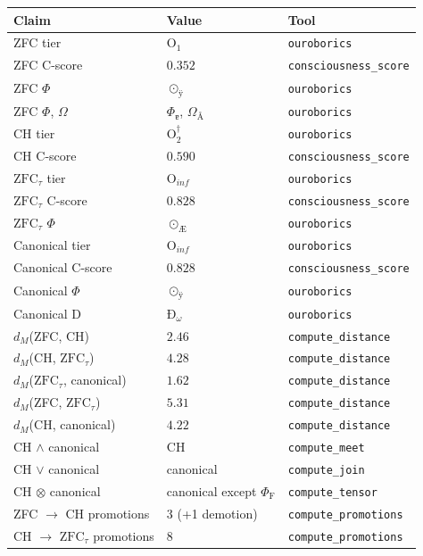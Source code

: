 \documentclass[12pt,twoside]{book}
\theoremstyle{definition}
\newcommand{\ZFCt}{\text{ZFC}_{\tau}}
\newcommand{\prim}[1]{\text{#1}}
\newcommand{\tier}[1]{\text{O}_{#1}}
\begin{document}
\begin{center}
\small
\begin{tabular}{lll}
\toprule
\textbf{Claim} & \textbf{Value} & \textbf{Tool} \\
\midrule
ZFC tier & $\tier{1}$ & \texttt{ouroborics} \\
ZFC C-score & $0.352$ & \texttt{consciousness\_score} \\
ZFC $\Phi$ & $\odot_{\text{ÿ}}$ & \texttt{ouroborics} \\
ZFC $\Phi$, $\Omega$ & $\Phi_{\text{ɐ}}$, $\Omega_{\text{Å}}$ & \texttt{ouroborics} \\
\midrule
CH tier & $\tier{2}^{\dagger}$ & \texttt{ouroborics} \\
CH C-score & $0.590$ & \texttt{consciousness\_score} \\
\midrule
$\ZFCt$ tier & $\tier{inf}$ & \texttt{ouroborics} \\
$\ZFCt$ C-score & $0.828$ & \texttt{consciousness\_score} \\
$\ZFCt$ $\Phi$ & $\odot_{\text{Æ}}$ & \texttt{ouroborics} \\
\midrule
Canonical tier & $\tier{inf}$ & \texttt{ouroborics} \\
Canonical C-score & $0.828$ & \texttt{consciousness\_score} \\
Canonical $\Phi$ & $\odot_{\text{ÿ}}$ & \texttt{ouroborics} \\
Canonical $\prim{D}$ & $\text{Ð}_{\omega}$ & \texttt{ouroborics} \\
\midrule
$d_M$(ZFC, CH) & $2.46$ & \texttt{compute\_distance} \\
$d_M$(CH, $\ZFCt$) & $4.28$ & \texttt{compute\_distance} \\
$d_M$($\ZFCt$, canonical) & $1.62$ & \texttt{compute\_distance} \\
$d_M$(ZFC, $\ZFCt$) & $5.31$ & \texttt{compute\_distance} \\
$d_M$(CH, canonical) & $4.22$ & \texttt{compute\_distance} \\
\midrule
CH $\wedge$ canonical & CH & \texttt{compute\_meet} \\
CH $\vee$ canonical & canonical & \texttt{compute\_join} \\
CH $\otimes$ canonical & canonical except $\Phi_{\text{F}}$ & \texttt{compute\_tensor} \\
\midrule
ZFC $\to$ CH promotions & 3 (+1 demotion) & \texttt{compute\_promotions} \\
CH $\to$ $\ZFCt$ promotions & 8 & \texttt{compute\_promotions} \\

\end{tabular}
\end{center}
\end{document}
